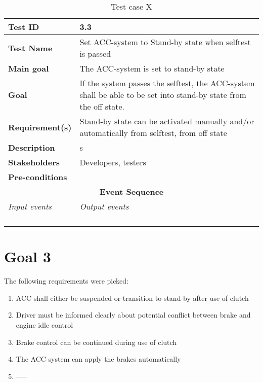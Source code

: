 \begin{table}[H]
\centering
\begin{tabularx}{\linewidth}{X|X}
  \hline
  \textbf{Test ID} & 3.3\\
  \hline
  \textbf{Test Name} & Set ACC-system to Stand-by state when selftest is passed \\
  \hline
  \textbf{Main goal} & The ACC-system is set to stand-by state \\
  \hline
  \textbf{Goal} & If the system passes the selftest, the ACC-system shall be able to be set into stand-by state from the off state. \\
  \hline
  \textbf{Requirement(s)} &  Stand-by state can be activated manually and/or automatically from selftest, from off state \\
  \hline
  \textbf{Description} & s \\
  \hline
  \textbf{Stakeholders} & Developers, testers \\
  \hline
  \textbf{Pre-conditions} &  \\
  \hline
  \multicolumn{2}{c}{\textbf{Event Sequence}} \\
  \hline
  \textit{Input events} & \textit{Output events} \\
  \hline
   &  \\
  \hline
   &  \\
  \hline
   &  \\
  \hline
   &  \\
  \hline
  \end{tabularx}
\caption{\label{tab_caseX} Test case X}
\end{table}



\section{Goal 3}
The following requirements were picked:

\begin{enumerate}
    \item ACC shall either be suspended or transition to stand-by after use of clutch
    \item Driver must be informed clearly about potential conflict between brake and engine idle control
    \item Brake control can be continued during use of clutch
    \item The ACC system can apply the brakes automatically
    \item -----
\end{enumerate}

